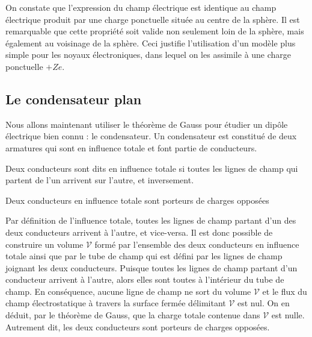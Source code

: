 \documentclass[11pt,fleqn]{book} %
\begin{document}
\begin{remark}
    On constate que l'expression du champ électrique est identique au champ électrique produit par une charge ponctuelle située au centre de la sphère. Il est remarquable que cette propriété soit valide non seulement loin de la sphère, mais également au voisinage de la sphère. Ceci justifie l'utilisation d'un modèle plus simple pour les noyaux électroniques, dans lequel on les assimile à une charge ponctuelle $+Ze$.
\end{remark}


\subsection{Le condensateur plan}

Nous allons maintenant utiliser le théorème de Gauss pour étudier un dipôle électrique bien connu : le condensateur. Un condensateur est constitué de deux armatures qui sont en influence totale et font partie de conducteurs.

\begin{definition}
    Deux conducteurs sont dits en influence totale si toutes les lignes de champ qui partent de l'un arrivent sur l'autre, et inversement.
\end{definition}

\begin{proposition}
    Deux conducteurs en influence totale sont porteurs de charges opposées
\end{proposition}

\begin{demonstration}
Par définition de l'influence totale, toutes les lignes de champ partant d'un des deux conducteurs arrivent à l'autre, et vice-versa. Il est donc possible de construire un volume $\mathcal{V}$ formé par l'ensemble des deux conducteurs en influence totale ainsi que par le tube de champ qui est défini par les lignes de champ joignant les deux conducteurs. Puisque toutes les lignes de champ partant d'un conducteur arrivent à l'autre, alors elles sont toutes à l'intérieur du tube de champ. En conséquence, aucune ligne de champ ne sort du volume $\mathcal{V}$ et le flux du champ électrostatique à travers la surface fermée délimitant $\mathcal{V}$ est nul. On en déduit, par le théorème de Gauss, que la charge totale contenue dans $\mathcal{V}$ est nulle. Autrement dit, les deux conducteurs sont porteurs de charges opposées.    
\end{demonstration}
\end{document}
